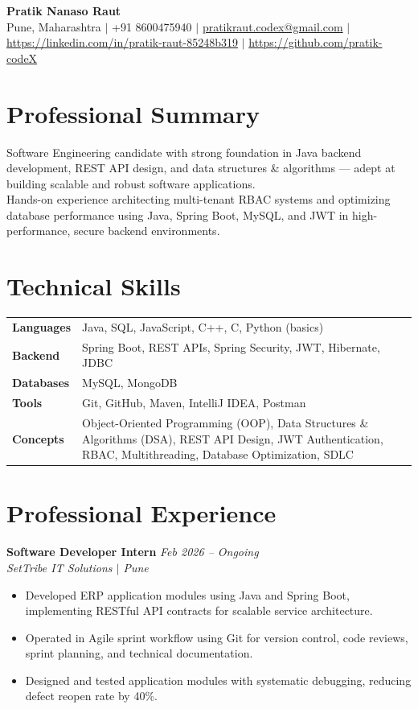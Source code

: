 \documentclass[10.5pt,a4paper]{article}
\begin{document}
\begin{center}
{\Large\bfseries Pratik Nanaso Raut}\\[2pt]
Pune, Maharashtra $|$ +91 8600475940 $|$ \href{mailto:pratikraut.codex@gmail.com}{pratikraut.codex@gmail.com} $|$ \href{https://linkedin.com/in/pratik-raut-85248b319}{https://linkedin.com/in/pratik-raut-85248b319} $|$ \href{https://github.com/pratik-codeX}{https://github.com/pratik-codeX}
\end{center}
\vspace{-2pt}
\section{Professional Summary}
Software Engineering candidate with strong foundation in Java backend development, REST API design, and data structures \& algorithms — adept at building scalable and robust software applications.\\[2pt]
Hands-on experience architecting multi-tenant RBAC systems and optimizing database performance using Java, Spring Boot, MySQL, and JWT in high-performance, secure backend environments.
\section{Technical Skills}
\begin{tabular}{@{}p{}p{}@{}}
\textbf{Languages} & Java, SQL, JavaScript, C++, C, Python (basics) \\[1pt]
\textbf{Backend} & Spring Boot, REST APIs, Spring Security, JWT, Hibernate, JDBC \\[1pt]
\textbf{Databases} & MySQL, MongoDB \\[1pt]
\textbf{Tools} & Git, GitHub, Maven, IntelliJ IDEA, Postman \\[1pt]
\textbf{Concepts} & Object-Oriented Programming (OOP), Data Structures \& Algorithms (DSA), REST API Design, JWT Authentication, RBAC, Multithreading, Database Optimization, SDLC \\
\end{tabular}
\section{Professional Experience}
\textbf{Software Developer Intern} \hfill \textit{Feb 2026 -- Ongoing}
\\\textit{SetTribe IT Solutions $|$ Pune}
\begin{itemize}
  \item Developed ERP application modules using Java and Spring Boot, implementing RESTful API contracts for scalable service architecture.
  \item Operated in Agile sprint workflow using Git for version control, code reviews, sprint planning, and technical documentation.
  \item Designed and tested application modules with systematic debugging, reducing defect reopen rate by 40\%.
\end{itemize}
\end{document}
